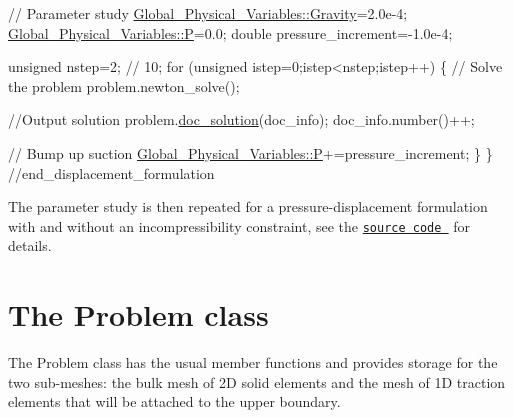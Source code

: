 \begin{DoxyCodeInclude}
  
  \textcolor{comment}{// Parameter study}
  \hyperlink{namespaceGlobal__Physical__Variables_a8b80d3e8d63b8d0a0ed435a2dd7fe2ad}{Global\_Physical\_Variables::Gravity}=2.0e-4;
  \hyperlink{namespaceGlobal__Physical__Variables_a23c2ade6398f54040b869f7f3a2bcc4b}{Global\_Physical\_Variables::P}=0.0;
  \textcolor{keywordtype}{double} pressure\_increment=-1.0e-4;
  
  \textcolor{keywordtype}{unsigned} nstep=2; \textcolor{comment}{// 10;}
  \textcolor{keywordflow}{for} (\textcolor{keywordtype}{unsigned} istep=0;istep<nstep;istep++)
   \{
    \textcolor{comment}{// Solve the problem}
    problem.newton\_solve();
    
    \textcolor{comment}{//Output solution}
    problem.\hyperlink{classUnstructuredSolidProblem_ab3d66fd61b69d12b4f159d763fc44f15}{doc\_solution}(doc\_info);
    doc\_info.number()++;
    
    \textcolor{comment}{// Bump up suction}
    \hyperlink{namespaceGlobal__Physical__Variables_a23c2ade6398f54040b869f7f3a2bcc4b}{Global\_Physical\_Variables::P}+=pressure\_increment;
   \}
 \} \textcolor{comment}{//end\_displacement\_formulation}

\end{DoxyCodeInclude}


The parameter study is then repeated for a pressure-\/displacement formulation with and without an incompressibility constraint, see the \href{../../../../demo_drivers/solid/unstructured_solid/unstructured_two_d_solid.cc}{\tt source code } for details.



 

\hypertarget{index_class}{}\section{The Problem class}\label{index_class}
The {\ttfamily Problem} class has the usual member functions and provides storage for the two sub-\/meshes\+: the bulk mesh of 2D solid elements and the mesh of 1D traction elements that will be attached to the upper boundary.

